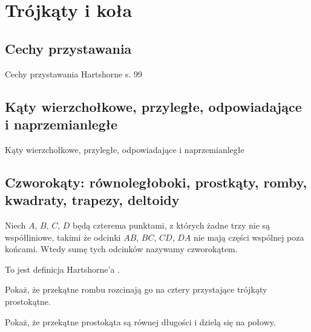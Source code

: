 \section{Trójkąty i koła}
\subsection{Cechy przystawania}
Cechy przystawania
\loremipsum
Hartshorne s. 99

\subsection{Kąty wierzchołkowe, przyległe, odpowiadające i naprzemianległe}
Kąty wierzchołkowe, przyległe, odpowiadające i naprzemianległe
\loremipsum





\subsection{Czworokąty: równoległoboki, prostkąty, romby, kwadraty, trapezy, deltoidy}

\begin{definition}[czworokąt]
    Niech $A$, $B$, $C$, $D$ będą czterema punktami, z których żadne trzy nie są współliniowe, takimi że odcinki $AB$, $BC$, $CD$, $DA$ nie mają części wspólnej poza końcami.
    Wtedy sumę tych odcinków nazywamy czworokątem.
\end{definition}

To jest definicja Hartshorne'a \cite[s. 80]{hartshorne2000}.

Pokaż, że przekątne rombu rozcinają go na cztery przystające trójkąty prostokątne. %

Pokaż, że przekątne prostokąta są równej długości i dzielą się na połowy. %



